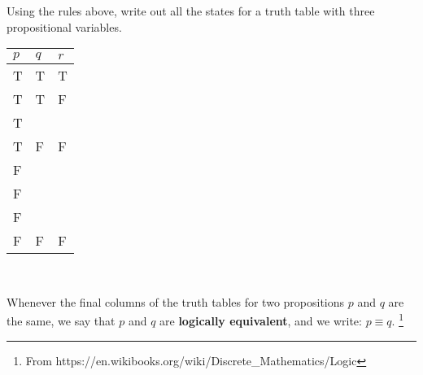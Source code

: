     \begin{questionNOGRADE}{\thequestion}
        Using the rules above, write out all the states for a
        truth table with three propositional variables. ~\\
        
        \begin{center}
            \begin{tabular}{ | p{2cm} | p{2cm} | p{2cm} | }
                \hline
                $p$ & $q$ & $r$   \\ \hline
                T & T & T         \\ \hline
                T & T & F         \\ \hline
                T &  &          \\ \hline
                T & F & F         \\ \hline
                F &  &          \\ \hline
                F &  &          \\ \hline
                F &  &          \\ \hline
                F & F & F         \\ \hline
            \end{tabular}
        \end{center}
    \end{questionNOGRADE}

    ~\\
        
    \newpage

    \begin{introNOHEAD}{}
        Whenever the final columns of the truth tables for two propositions $p$ and $q$ are the same,
        we say that $p$ and $q$ are \textbf{logically equivalent}, and we write: $p \equiv q$.
        \footnote{From https://en.wikibooks.org/wiki/Discrete\_Mathematics/Logic}
    \end{introNOHEAD}




